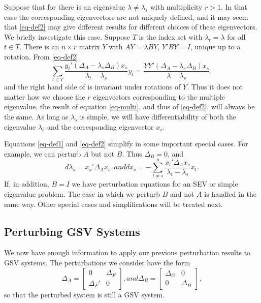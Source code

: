 \documentclass[
  12pt,
  letterpaper,
  DIV=11,
  numbers=noendperiod]{scrartcl}
\begin{document}
Suppose that for there is an eigenvalue \(\lambda\not=\lambda_s\) with
multiplicity \(r>1\). In that case the corresponding eigenvectors are
not uniquely defined, and it may seem that \eqref{eq-def2} may give
different results for different choices of these eigenvectors. We
briefly investigate this case. Suppose \(T\) is the index set with
\(\lambda_t=\lambda\) for all \(t\in  T\). There is an \(n\times r\)
matrix \(Y\) with \(AY=\lambda BY\), \(Y'BY=I\), unique up to a
rotation. From \eqref{eq-def2} \begin{equation}
\sum_{t\in T}\frac{y_t'(\Delta_A-\lambda_s\Delta_B)x_s}{\lambda_t-\lambda_s}y_t=\frac{YY'(\Delta_A-\lambda_s\Delta_B)x_s}{\lambda-\lambda_s},\label{eq-multi}
\end{equation} and the right hand side of \label{eq-multi} is invariant
under rotations of \(Y\). Thus it does not matter how we choose the
\(r\) eigenvectors corresponding to the multiple eigenvalue, the result
of equation \eqref{eq-multi}, and thus of \eqref{eq-def2}, will always
be the same. As long as \(\lambda_s\) is simple, we will have
differentiability of both the eigenvalue \(\lambda_s\) and the
corresponding eigenvector \(x_s\).

Equations \eqref{eq-def1} and \eqref{eq-def2} simplify in some important
special cases. For example, we can perturb \(A\) but not \(B\). Thus
\(\Delta_B=0\), and \begin{subequations}
\begin{equation}
d\lambda_s=x_s'\Delta_Ax_s\label{eq-sim1},
\end{equation}
and
\begin{equation}
dx_s=-\sum_{t\not= s}^n\frac{x_t'\Delta_Ax_s}{\lambda_t-\lambda_s}x_t.\label{eq-sim2}
\end{equation}
\end{subequations} If, in addition, \(B=I\) we have perturbation
equations for an SEV or simple eigenvalue problem. The case in which we
perturb \(B\) and not \(A\) is handled in the same way. Other special
cases and simplifications will be treated next.

\subsection{Perturbing GSV Systems}\label{sec-GSV}

We now have enough information to apply our previous perturbation
results to GSV systems. The perturbations we consider have the form
\begin{subequations}
\begin{equation}
\Delta_A=\begin{bmatrix}
0&\Delta_F\\
\Delta_F'&0
\end{bmatrix},\label{eq-asvdp}
\end{equation}
and
\begin{equation}
\Delta_B=\begin{bmatrix}
\Delta_G&0\\
0&\Delta_H
\end{bmatrix},\label{eq-bsvdp}
\end{equation}
\end{subequations} so that the perturbed system is still a GSV system.
\end{document}
